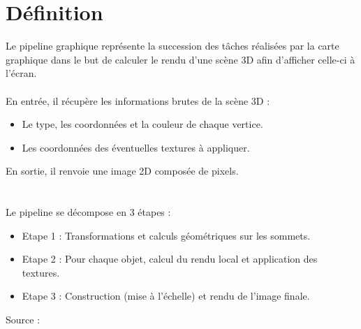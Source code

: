 \section{Définition}
Le pipeline graphique représente la succession des tâches réalisées par la carte graphique dans le but de calculer le rendu d'une scène 3D afin d'afficher celle-ci à l'écran.
\\\\
En entrée, il récupère les informations brutes de la scène 3D :
\begin{itemize}
\item Le type, les coordonnées et la couleur de chaque vertice.
\item Les coordonnées des éventuelles textures à appliquer.
\\
\end{itemize}

En sortie, il renvoie une image 2D composée de pixels.
\\
\\\\
Le pipeline se décompose en 3 étapes : 
\begin{itemize}
  \item Etape 1 : Transformations et calculs géométriques sur les sommets.
  \item Etape 2 : Pour chaque objet, calcul du rendu local et application des textures.
  \item Etape 3 : Construction (mise à l'échelle) et rendu de l'image finale.\end{itemize}

Source : \cite{pipeline2}
\newpage
